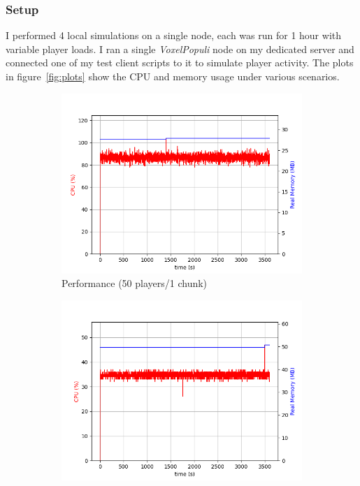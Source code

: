 \documentclass[12pt,notitlepage,a4paper]{report}
\newcommand{\voxpop}{\emph{VoxelPopuli}}
\begin{document}
	\subsubsection{Setup}
	I performed 4 local simulations on a single node, each was run for 1 hour with variable player loads. I ran a single \voxpop{} node on my dedicated server and connected one of my test client scripts to it to simulate player activity. The plots in figure~\ref{fig:plots} show the CPU and memory usage under various scenarios.
	\begin{figure}[!ht]
		\begin{subfigure}{0.5\textwidth}
			\includegraphics[width=\textwidth]{plot1.png}
			\caption{Performance (50 players/1 chunk)}
			\label{fig:plot1}
		\end{subfigure}
		\begin{subfigure}{0.5\textwidth}
			\includegraphics[width=\textwidth]{plot2.png}

\end{subfigure}
\end{figure}
\end{document}
